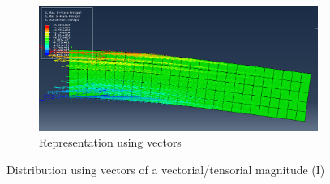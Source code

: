 \begin{enumerate}
\begin{figure}[H]
    ~ %
    \begin{subfigure}{0.55\textwidth}
      \includegraphics[width=\textwidth]{./body/images/imagen83}
      \caption{Representation using vectors}
      \label{figu83}
    \end{subfigure}%
    \caption{Distribution using vectors of a vectorial/tensorial
      magnitude (I)}
  \end{figure}


\end{enumerate}

